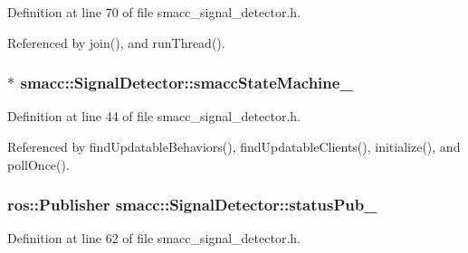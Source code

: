 Definition at line 70 of file smacc\+\_\+signal\+\_\+detector.\+h.



Referenced by join(), and run\+Thread().

\subsubsection[{\texorpdfstring{smacc\+State\+Machine\+\_\+}{smaccStateMachine_}}]{$\ast$ smacc\+::\+Signal\+Detector\+::smacc\+State\+Machine\+\_\+\hspace{0.3cm}{\ttfamily [private]}}\hypertarget{classsmacc_1_1SignalDetector_a46025de6ac7b5980e22144f9703236a4}{}\label{classsmacc_1_1SignalDetector_a46025de6ac7b5980e22144f9703236a4}


Definition at line 44 of file smacc\+\_\+signal\+\_\+detector.\+h.



Referenced by find\+Updatable\+Behaviors(), find\+Updatable\+Clients(), initialize(), and poll\+Once().

\subsubsection[{\texorpdfstring{status\+Pub\+\_\+}{statusPub_}}]{\setlength{\rightskip}{0pt plus 5cm}ros\+::\+Publisher smacc\+::\+Signal\+Detector\+::status\+Pub\+\_\+\hspace{0.3cm}{\ttfamily [private]}}\hypertarget{classsmacc_1_1SignalDetector_ae065bbd4e699e5fce00fbc508dedd4c1}{}\label{classsmacc_1_1SignalDetector_ae065bbd4e699e5fce00fbc508dedd4c1}


Definition at line 62 of file smacc\+\_\+signal\+\_\+detector.\+h.

